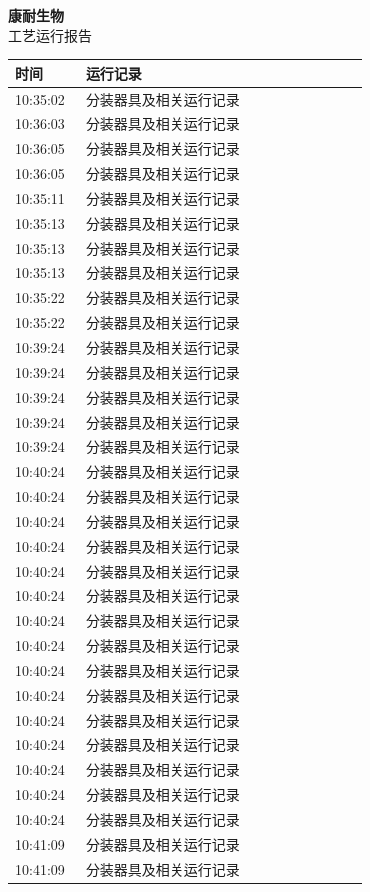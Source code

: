 \documentclass[UTF8,10pt,a4paper,fontset=fandol]{ctexart}
\begin{document}
\begin{center}
\begin{minipage}[t]{0.46\linewidth}
\centering
\textbf{康耐生物}\\[2pt]
工艺运行报告

\vspace{4pt}
\begin{tabular}{|p{0.18\linewidth}|p{0.72\linewidth}|}
\hline
时间 & 运行记录 \\ \hline
10:35:02 & 分装器具及相关运行记录 \\ \hline
10:36:03 & 分装器具及相关运行记录 \\ \hline
10:36:05 & 分装器具及相关运行记录 \\ \hline
10:36:05 & 分装器具及相关运行记录 \\ \hline
10:35:11 & 分装器具及相关运行记录 \\ \hline
10:35:13 & 分装器具及相关运行记录 \\ \hline
10:35:13 & 分装器具及相关运行记录 \\ \hline
10:35:13 & 分装器具及相关运行记录 \\ \hline
10:35:22 & 分装器具及相关运行记录 \\ \hline
10:35:22 & 分装器具及相关运行记录 \\ \hline
10:39:24 & 分装器具及相关运行记录 \\ \hline
10:39:24 & 分装器具及相关运行记录 \\ \hline
10:39:24 & 分装器具及相关运行记录 \\ \hline
10:39:24 & 分装器具及相关运行记录 \\ \hline
10:39:24 & 分装器具及相关运行记录 \\ \hline
10:40:24 & 分装器具及相关运行记录 \\ \hline
10:40:24 & 分装器具及相关运行记录 \\ \hline
10:40:24 & 分装器具及相关运行记录 \\ \hline
10:40:24 & 分装器具及相关运行记录 \\ \hline
10:40:24 & 分装器具及相关运行记录 \\ \hline
10:40:24 & 分装器具及相关运行记录 \\ \hline
10:40:24 & 分装器具及相关运行记录 \\ \hline
10:40:24 & 分装器具及相关运行记录 \\ \hline
10:40:24 & 分装器具及相关运行记录 \\ \hline
10:40:24 & 分装器具及相关运行记录 \\ \hline
10:40:24 & 分装器具及相关运行记录 \\ \hline
10:40:24 & 分装器具及相关运行记录 \\ \hline
10:40:24 & 分装器具及相关运行记录 \\ \hline
10:40:24 & 分装器具及相关运行记录 \\ \hline
10:40:24 & 分装器具及相关运行记录 \\ \hline
10:41:09 & 分装器具及相关运行记录 \\ \hline
10:41:09 & 分装器具及相关运行记录 \\ \hline
\end{tabular}


\end{minipage}
\end{center}
\end{document}
